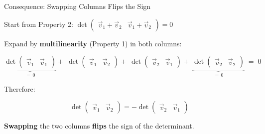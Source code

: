 \documentclass[10pt]{beamer}
\theoremstyle{definition}
\newcommand{\x}[1]{\alert{\textbf{#1}}}
\begin{document}
\begin{frame}{Consequence: Swapping Columns Flips the Sign}

Start from Property 2: \quad
$\det \begin{pmatrix} \vec{v}_1{+}\vec{v}_2 & \vec{v}_1{+}\vec{v}_2 \end{pmatrix} = 0$

\vfill
Expand by \x{multilinearity} (Property 1) in both columns:

$$
\underbrace{\det \begin{pmatrix} \vec{v}_1 & \vec{v}_1 \end{pmatrix}}_{=\,0}
+\; \det \begin{pmatrix} \vec{v}_1 & \vec{v}_2 \end{pmatrix}
+\; \det \begin{pmatrix} \vec{v}_2 & \vec{v}_1 \end{pmatrix}
+\; \underbrace{\det \begin{pmatrix} \vec{v}_2 & \vec{v}_2 \end{pmatrix}}_{=\,0}
\;=\; 0
$$

\vfill
Therefore:

$$
\boxed{\;\det \begin{pmatrix} \vec{v}_1 & \vec{v}_2 \end{pmatrix}
= -\det \begin{pmatrix} \vec{v}_2 & \vec{v}_1 \end{pmatrix}\;}
$$

\vfill
\x{Swapping} the two columns \x{flips} the sign of the determinant.

\end{frame}
\end{document}
